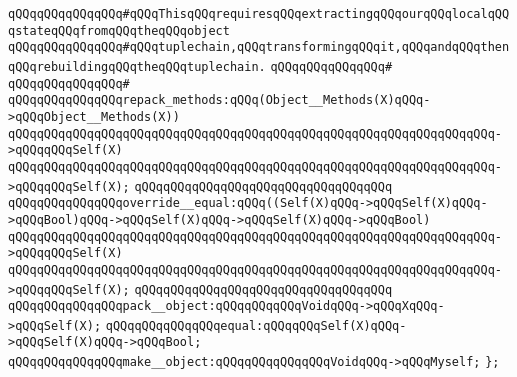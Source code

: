 \verb|qQQqqQQqqQQqqQQq#qQQqThisqQQqrequiresqQQqextractingqQQqourqQQqlocalqQQqstateqQQqfromqQQqtheqQQqobject|\newline
\verb|qQQqqQQqqQQqqQQq#qQQqtuplechain,qQQqtransformingqQQqit,qQQqandqQQqthenqQQqrebuildingqQQqtheqQQqtuplechain.|\newline
\verb|qQQqqQQqqQQqqQQq#|\newline
\verb|qQQqqQQqqQQqqQQq#|\newline
\verb|qQQqqQQqqQQqqQQqrepack_methods:qQQq(Object__Methods(X)qQQq->qQQqObject__Methods(X))|\newline
\verb|qQQqqQQqqQQqqQQqqQQqqQQqqQQqqQQqqQQqqQQqqQQqqQQqqQQqqQQqqQQqqQQqqQQq->qQQqqQQqSelf(X)|\newline
\verb|qQQqqQQqqQQqqQQqqQQqqQQqqQQqqQQqqQQqqQQqqQQqqQQqqQQqqQQqqQQqqQQqqQQq->qQQqqQQqSelf(X);|\newline
\verb|qQQqqQQqqQQqqQQqqQQqqQQqqQQqqQQqqQQq|\newline
\verb|qQQqqQQqqQQqqQQqoverride__equal:qQQq((Self(X)qQQq->qQQqSelf(X)qQQq->qQQqBool)qQQq->qQQqSelf(X)qQQq->qQQqSelf(X)qQQq->qQQqBool)|\newline
\verb|qQQqqQQqqQQqqQQqqQQqqQQqqQQqqQQqqQQqqQQqqQQqqQQqqQQqqQQqqQQqqQQqqQQq->qQQqqQQqSelf(X)|\newline
\verb|qQQqqQQqqQQqqQQqqQQqqQQqqQQqqQQqqQQqqQQqqQQqqQQqqQQqqQQqqQQqqQQqqQQq->qQQqqQQqSelf(X);|\newline
\verb|qQQqqQQqqQQqqQQqqQQqqQQqqQQqqQQqqQQq|\newline
\verb|qQQqqQQqqQQqqQQqpack__object:qQQqqQQqqQQqVoidqQQq->qQQqXqQQq->qQQqSelf(X);|\newline
\newline
\verb|qQQqqQQqqQQqqQQqequal:qQQqqQQqSelf(X)qQQq->qQQqSelf(X)qQQq->qQQqBool;|\newline
\newline
\verb|qQQqqQQqqQQqqQQqmake__object:qQQqqQQqqQQqqQQqVoidqQQq->qQQqMyself;|\newline
\verb|};|\newline
\newline

